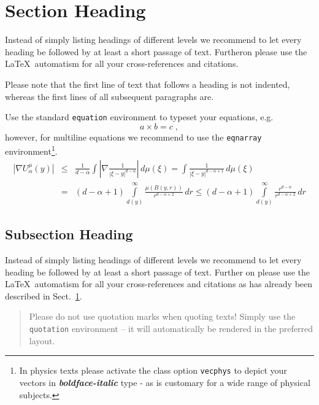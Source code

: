 \section{Section Heading}
\label{sec:2}
Instead of simply listing headings of different levels we recommend to let every heading be followed by at least a short passage of text. Furtheron please use the \LaTeX\ automatism for all your cross-references and citations.

Please note that the first line of text that follows a heading is not indented, whereas the first lines of all subsequent paragraphs are.

\eject

Use the standard \verb|equation| environment to typeset your equations, e.g.
%
\begin{equation}
a \times b = c\;,
\end{equation}
%
however, for multiline equations we recommend to use the \verb|eqnarray| environment\footnote{In physics texts please activate the class option \texttt{vecphys} to depict your vectors in \textbf{\itshape boldface-italic} type - as is customary for a wide range of physical subjects.}.
\begin{eqnarray}
\left|\nabla U_{\alpha}^{\mu}(y)\right| &\le&\frac1{d-\alpha}\int
\left|\nabla\frac1{|\xi-y|^{d-\alpha}}\right|\,d\mu(\xi) =
\int \frac1{|\xi-y|^{d-\alpha+1}} \,d\mu(\xi)\qquad  \\
&=&(d-\alpha+1) \int\limits_{d(y)}^\infty
\frac{\mu(B(y,r))}{r^{d-\alpha+2}}\,dr \le (d-\alpha+1)
\int\limits_{d(y)}^\infty \frac{r^{d-\alpha}}{r^{d-\alpha+2}}\,dr
\label{eq:10}
\end{eqnarray}

\enlargethispage{24pt}

\subsection{Subsection Heading}
\label{subsec:2}
Instead of simply listing headings of different levels we recommend to let every heading be followed by at least a short passage of text. Further on please use the \LaTeX\ automatism for all your cross-references and citations as has already been described in Sect.~\ref{sec:2}.

\begin{quotation}
Please do not use quotation marks when quoting texts! Simply use the \verb|quotation| environment -- it will automatically be rendered in the preferred layout.
\end{quotation}


